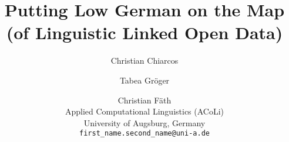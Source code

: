 \documentclass[11pt]{article}
\title{Putting Low German on the Map (of Linguistic Linked Open Data)}
\author{Christian Chiarcos \and Tabea Gröger \and Christian Fäth \\
  Applied Computational Linguistics (ACoLi)\\
  University of Augsburg, Germany \\
  \texttt{first\_name.second\_name@uni-a.de}
}
\newcommand{\ign}[1]{}                                  %
\begin{document}
\maketitle
\begin{abstract}

\end{abstract}







\ign{
    
}



\onecolumn

\appendix


\end{document}
